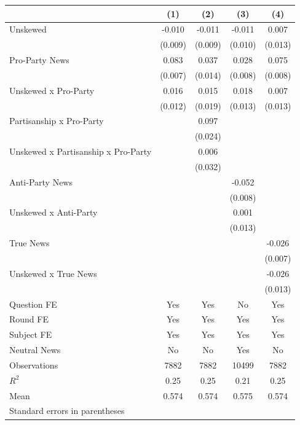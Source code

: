 \begin{tabular}{l*{4}{c}}
\hline\hline
                                   &\multicolumn{1}{c}{(1)}&\multicolumn{1}{c}{(2)}&\multicolumn{1}{c}{(3)}&\multicolumn{1}{c}{(4)}\\
\hline
Unskewed                           &   -0.010&   -0.011&   -0.011&    0.007\\
                                   &  (0.009)&  (0.009)&  (0.010)&  (0.013)\\
Pro-Party News                     &    0.083&    0.037&    0.028&    0.075\\
                                   &  (0.007)&  (0.014)&  (0.008)&  (0.008)\\
Unskewed x Pro-Party               &    0.016&    0.015&    0.018&    0.007\\
                                   &  (0.012)&  (0.019)&  (0.013)&  (0.013)\\
Partisanship x Pro-Party           &         &    0.097&         &         \\
                                   &         &  (0.024)&         &         \\
Unskewed x Partisanship x Pro-Party&         &    0.006&         &         \\
                                   &         &  (0.032)&         &         \\
Anti-Party News                    &         &         &   -0.052&         \\
                                   &         &         &  (0.008)&         \\
Unskewed x Anti-Party              &         &         &    0.001&         \\
                                   &         &         &  (0.013)&         \\
True News                          &         &         &         &   -0.026\\
                                   &         &         &         &  (0.007)\\
Unskewed x True News               &         &         &         &   -0.026\\
                                   &         &         &         &  (0.013)\\
Question FE                        &      Yes&      Yes&       No&      Yes\\
Round FE                           &      Yes&      Yes&      Yes&      Yes\\
Subject FE                         &      Yes&      Yes&      Yes&      Yes\\
Neutral News                       &       No&       No&      Yes&       No\\
\hline
Observations                       &     7882&     7882&    10499&     7882\\
\(R^{2}\)                          &     0.25&     0.25&     0.21&     0.25\\
Mean                               &    0.574&    0.574&    0.575&    0.574\\
\hline\hline
\multicolumn{5}{l}{\footnotesize Standard errors in parentheses}\\
\end{tabular}
